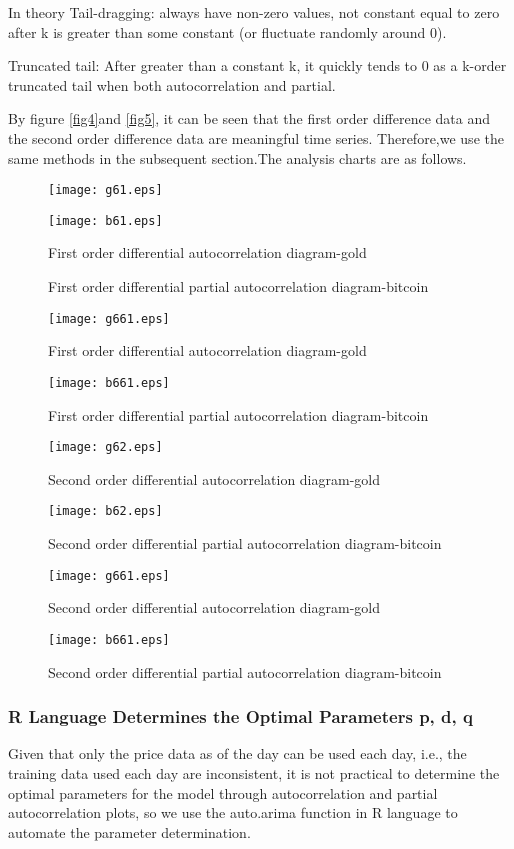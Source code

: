 \documentclass{mcmthesis}
\begin{document}
In theory
Tail-dragging: always have non-zero values, not constant equal to zero after k is greater than some constant (or fluctuate randomly around 0).

Truncated tail: After greater than a constant k, it quickly tends to 0 as a k-order truncated tail when both autocorrelation and partial.

By figure \ref{fig4}and \ref{fig5}, it can be seen that the first order difference data and the second order difference data are meaningful time series.
Therefore,we use the same methods in the subsequent section.The analysis charts are as follows.

\begin{figure}[htbp]
  \centering
  \texttt{[image: g61.eps]}
  \caption{First order differential autocorrelation diagram-gold}
  \texttt{[image: b61.eps]}
\end{figure}
\begin{figure}[htbp]
  \caption{First order differential partial autocorrelation diagram-bitcoin} 
  \texttt{[image: g661.eps]}
  \caption{First order differential autocorrelation diagram-gold}
  \texttt{[image: b661.eps]}
  \caption{First order differential partial autocorrelation diagram-bitcoin} 
\end{figure}

\begin{figure}[!h]
  \texttt{[image: g62.eps]}
  \caption{Second order differential autocorrelation diagram-gold}
  \texttt{[image: b62.eps]}
  \caption{Second order differential partial autocorrelation diagram-bitcoin} 
  \texttt{[image: g661.eps]}
  \caption{Second order differential autocorrelation diagram-gold}
  \texttt{[image: b661.eps]}
  \caption{Second order differential partial autocorrelation diagram-bitcoin} 
  \label{fig661}
\end{figure}


\subsubsection{R Language Determines the Optimal Parameters p, d, q}
Given that only the price data as of the day can be used each day, i.e., 
the training data used each day are inconsistent,
it is not practical to determine the optimal parameters for the model through autocorrelation and partial autocorrelation plots, 
so we use the auto.arima function in R language to automate the parameter determination.
\end{document}
